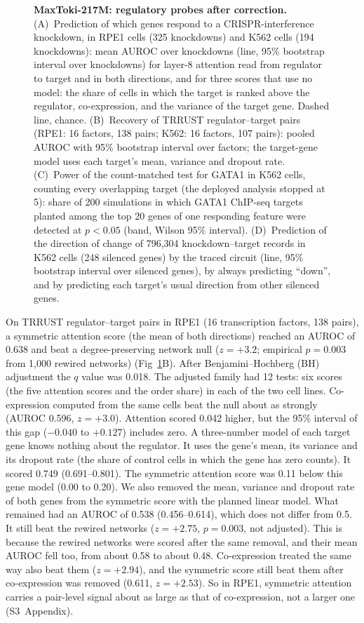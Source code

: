 \begin{figure}[H]
\caption{\textbf{MaxToki-217M: regulatory probes after correction.}
(A)~Prediction of which genes respond to a CRISPR-interference knockdown,
in RPE1 cells (325 knockdowns) and K562 cells (194 knockdowns): mean
AUROC over knockdowns (line, 95\% bootstrap interval over knockdowns) for
layer-8 attention read from regulator to target and in both directions,
and for three scores that use no model: the share of cells in which the
target is ranked above the regulator, co-expression, and the variance of
the target gene. Dashed line, chance. (B)~Recovery of TRRUST
regulator--target pairs (RPE1: 16 factors, 138 pairs; K562: 16 factors,
107 pairs): pooled AUROC with 95\% bootstrap interval over factors; the
target-gene model uses each target's mean, variance and dropout rate.
(C)~Power of the count-matched test for GATA1 in K562 cells, counting
every overlapping target (the deployed analysis stopped at 5): share of
200 simulations in which GATA1 ChIP-seq targets planted among the top 20
genes of one responding feature were detected at $p<0.05$ (band, Wilson
95\% interval). (D)~Prediction of the direction of change of 796,304
knockdown--target records in K562 cells (248 silenced genes) by the
traced circuit (line, 95\% bootstrap interval over silenced genes), by
always predicting ``down'', and by predicting each target's usual
direction from other silenced genes.}
\label{fig:caseReg}
\end{figure}

On TRRUST regulator--target pairs in RPE1 (16 transcription factors, 138
pairs), a symmetric attention score (the mean of both directions) reached
an AUROC of 0.638 and beat a degree-preserving network null ($z = +3.2$;
empirical $p = 0.003$ from 1,000 rewired networks)
(Fig~\ref{fig:caseReg}B). After Benjamini--Hochberg (BH) adjustment the
$q$ value was 0.018. The adjusted family had 12 tests: six scores (the
five attention scores and the order share) in each of the two cell
lines. Co-expression computed from the same cells beat the null about as
strongly (AUROC 0.596, $z = +3.0$). Attention scored 0.042 higher, but
the 95\% interval of this gap ($-0.040$ to $+0.127$) includes zero. A
three-number model of each target gene knows nothing about the
regulator. It uses the gene's mean, its variance and its dropout rate
(the share of control cells in which the gene has zero counts). It scored
0.749 (0.691--0.801). The symmetric attention score was 0.11 below this
gene model (0.00 to 0.20). We also removed the mean, variance and
dropout rate of both genes from the symmetric score with the planned
linear model. What remained had an AUROC of 0.538 (0.456--0.614), which
does not differ from 0.5. It still beat the rewired networks
($z = +2.75$, $p = 0.003$, not adjusted). This is because the rewired
networks were scored after the same removal, and their mean AUROC fell
too, from about 0.58 to about 0.48. Co-expression treated the same way
also beat them ($z = +2.94$), and the symmetric score still beat them
after co-expression was removed
(0.611, $z = +2.53$). So in RPE1, symmetric attention carries a
pair-level signal about as large as that of co-expression, not a larger
one (S3~Appendix).


